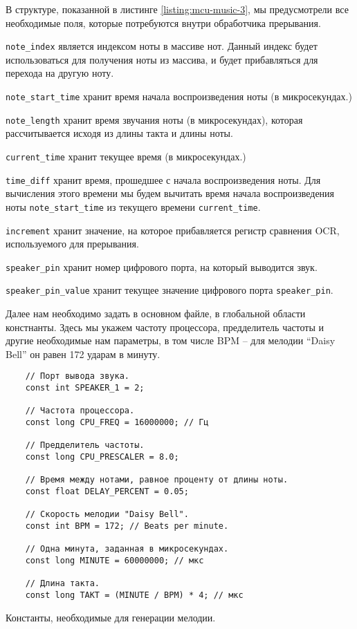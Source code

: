 \documentclass[../sparc.tex]{subfiles}
\begin{document}
В структуре, показанной в листинге \ref{listing:mcu-music-3}, мы предусмотрели
все необходимые поля, которые потребуются внутри обработчика прерывания.

\texttt{note_index} является индексом ноты в массиве нот.  Данный
индекс будет использоваться для получения ноты из массива, и будет прибавляться
для перехода на другую ноту.

\texttt{note_start_time} хранит время начала воспроизведения ноты (в
микросекундах.)

\texttt{note_length} хранит время звучания ноты (в микросекундах),
которая рассчитывается исходя из длины такта и длины ноты.

\texttt{current_time} хранит текущее время (в микросекундах.)

\texttt{time_diff} хранит время, прошедшее с начала воспроизведения
ноты.  Для вычисления этого времени мы будем вычитать время начала
воспроизведения ноты \texttt{note_start_time} из текущего времени
\texttt{current_time}.

\texttt{increment} хранит значение, на которое прибавляется регистр
сравнения OCR, используемого для прерывания.

\texttt{speaker_pin} хранит номер цифрового порта, на который выводится
звук.

\texttt{speaker_pin_value} хранит текущее значение цифрового порта
\texttt{speaker_pin}.

Далее нам необходимо задать в основном файле, в глобальной области констнанты.
Здесь мы укажем частоту процессора, предделитель частоты и другие необходимые
нам параметры, в том числе \gls{BPM} -- для мелодии ``Daisy Bell'' он равен 172
ударам в минуту.

\begin{listing}[H]
  \begin{verbatim}
    // Порт вывода звука.
    const int SPEAKER_1 = 2;

    // Частота процессора.
    const long CPU_FREQ = 16000000; // Гц

    // Предделитель частоты.
    const long CPU_PRESCALER = 8.0;

    // Время между нотами, равное проценту от длины ноты.
    const float DELAY_PERCENT = 0.05;

    // Скорость мелодии "Daisy Bell".
    const int BPM = 172; // Beats per minute.

    // Одна минута, заданная в микросекундах.
    const long MINUTE = 60000000; // мкс

    // Длина такта.
    const long TAKT = (MINUTE / BPM) * 4; // мкс
  \end{verbatim}
  \caption{Константы, необходимые для генерации мелодии.}
  \label{listing:mcu-music-4}
\end{listing}
\end{document}
